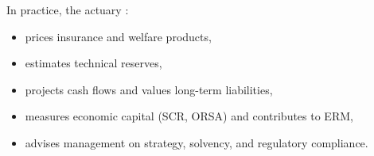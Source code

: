 \begin{f}[Actuary]
	
	In practice, the actuary :
	\begin{itemize}[nosep]
		\item prices insurance and welfare products,
		\item estimates technical reserves,
		\item projects cash flows and values long-term liabilities,
		\item measures economic capital (SCR, ORSA) and contributes to ERM,
		\item advises management on strategy, solvency, and regulatory compliance.
	\end{itemize}
	
\end{f}